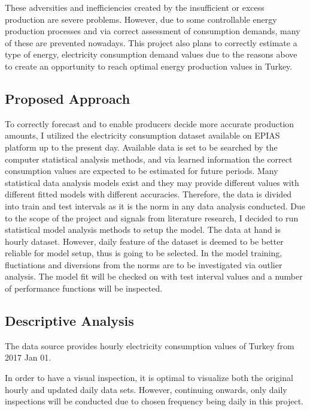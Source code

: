 \documentclass[11pt, a4paper, leqno]{article}
\begin{document}
These adversities and inefficiencies created by the insufficient or excess production are severe problems. However, due to some controllable energy production processes and via correct assessment of consumption demands, many of these are prevented nowadays. This project also plans to correctly estimate a type of energy, electricity consumption demand values due to the reasons above to create an opportunity to reach optimal energy production values in Turkey.







\subsection{Proposed Approach}
\label{subsec:propapp}

To correctly forecast and to enable producers decide more accurate production amounts, I utilized the electricity consumption dataset available on EPIAS platform up to the present day. Available data is set to be searched by the computer statistical analysis methods, and via learned information the correct consumption values are expected to be estimated for future periods.
Many statistical data analysis models exist and they may provide different values with different fitted models with different accuracies. Therefore, the data is divided into train and test intervals as it is the norm in any data analysis conducted.
Due to the scope of the project and signals from literature research, I decided to run statistical model analysis methods to setup the model.
The data at hand is hourly dataset. However, daily feature of the dataset is deemed to be better reliable for model setup, thus is going to be selected.
In the model training, fluctiations and diversions from the norms are to be investigated via outlier analysis.
The model fit will be checked on with test interval values and a number of performance functions will be inspected.

\subsection{Descriptive Analysis}
\label{subsec:descanalys}

The data source provides hourly electricity consumption values of Turkey from 2017 Jan 01.

In order to have a visual inspection, it is optimal to visualize both the original hourly and updated daily data sets. However, continuing onwards, only daily inspections will be conducted due to chosen frequency being daily in this project.
\end{document}
